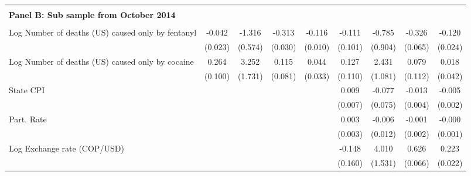 \begin{tabular}{lcccccccc}
 \hline  & & & & &  &  &  &  \\ \textbf{Panel B: Sub sample from October 2014} \\ & & & & & & & & \\
Log Number of deaths (US) caused only by fentanyl&      -0.042         &      -1.316\sym{*}  &      -0.313\sym{***}&      -0.116\sym{***}&      -0.111         &      -0.785         &      -0.326\sym{***}&      -0.120\sym{***}\\
                    &     (0.023)         &     (0.574)         &     (0.030)         &     (0.010)         &     (0.101)         &     (0.904)         &     (0.065)         &     (0.024)         \\
\addlinespace
Log Number of deaths (US) caused only by cocaine&       0.264\sym{**} &       3.252         &       0.115         &       0.044         &       0.127         &       2.431\sym{*}  &       0.079         &       0.018         \\
                    &     (0.100)         &     (1.731)         &     (0.081)         &     (0.033)         &     (0.110)         &     (1.081)         &     (0.112)         &     (0.042)         \\
\addlinespace
State CPI           &                     &                     &                     &                     &       0.009         &      -0.077         &      -0.013\sym{**} &      -0.005\sym{**} \\
                    &                     &                     &                     &                     &     (0.007)         &     (0.075)         &     (0.004)         &     (0.002)         \\
\addlinespace
Part. Rate          &                     &                     &                     &                     &       0.003         &      -0.006         &      -0.001         &      -0.000         \\
                    &                     &                     &                     &                     &     (0.003)         &     (0.012)         &     (0.002)         &     (0.001)         \\
\addlinespace
Log Exchange rate (COP/USD)&                     &                     &                     &                     &      -0.148         &       4.010\sym{**} &       0.626\sym{***}&       0.223\sym{***}\\
                    &                     &                     &                     &                     &     (0.160)         &     (1.531)         &     (0.066)         &     (0.022)         \\

\end{tabular}
